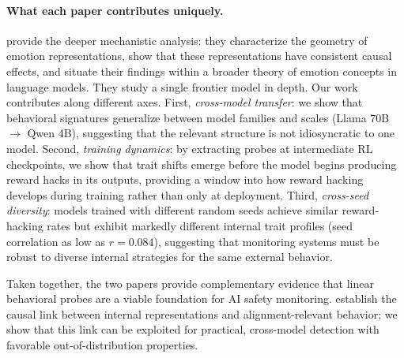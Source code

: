 \paragraph{What each paper contributes uniquely.}
\citet{sofroniew2026emotion} provide the deeper mechanistic analysis: they characterize the geometry of emotion representations, show that these representations have consistent causal effects, and situate their findings within a broader theory of emotion concepts in language models.
They study a single frontier model in depth.
Our work contributes along different axes.
First, \emph{cross-model transfer}: we show that behavioral signatures generalize between model families and scales (Llama 70B $\to$ Qwen 4B), suggesting that the relevant structure is not idiosyncratic to one model.
Second, \emph{training dynamics}: by extracting probes at intermediate RL checkpoints, we show that trait shifts emerge before the model begins producing reward hacks in its outputs, providing a window into how reward hacking develops during training rather than only at deployment.
Third, \emph{cross-seed diversity}: models trained with different random seeds achieve similar reward-hacking rates but exhibit markedly different internal trait profiles (seed correlation as low as $r = 0.084$), suggesting that monitoring systems must be robust to diverse internal strategies for the same external behavior.

Taken together, the two papers provide complementary evidence that linear behavioral probes are a viable foundation for AI safety monitoring.
\citet{sofroniew2026emotion} establish the causal link between internal representations and alignment-relevant behavior; we show that this link can be exploited for practical, cross-model detection with favorable out-of-distribution properties.
